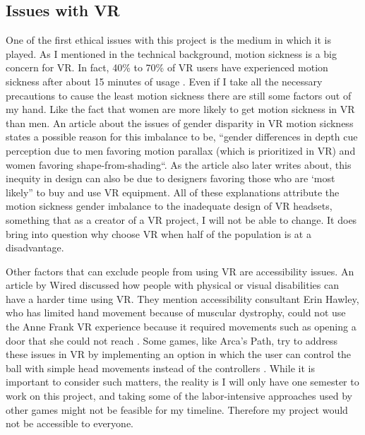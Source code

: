 \documentclass[11pt,twocolumn]{article}
\begin{document}
\subsection{Issues with VR}
One of the first ethical issues with this project is the medium in which it is played. As I mentioned in the technical background, motion sickness is a big concern for VR. In fact, 40\% to 70\% of VR users have experienced motion sickness after about 15 minutes of usage \cite{motionsicknessvr2019}. Even if I take all the necessary precautions to cause the least motion sickness there are still some factors out of my hand. Like the fact that women are more likely to get motion sickness in VR than men. An article about the issues of gender disparity in VR motion sickness states a possible reason for this imbalance to be, “gender differences in depth cue perception due to men favoring motion parallax (which is prioritized in VR) and women favoring shape-from-shading“\cite{vrbarriers2018}. As the article also later writes about, this inequity in design can also be due to designers favoring those who are ‘most likely” to buy and use VR equipment\cite{vrbarriers2018}. All of these explanations attribute the motion sickness gender imbalance to the inadequate design of VR headsets, something that as a creator of a VR project, I will not be able to change. It does bring into question why choose VR when half of the population is at a disadvantage. 

Other factors that can exclude people from using VR are accessibility issues. An article by Wired discussed how people with physical or visual disabilities can have a harder time using VR. They mention accessibility consultant Erin Hawley, who has limited hand movement because of muscular dystrophy, could not use the Anne Frank VR experience because it required movements such as opening a door that she could not reach \cite{vraccessibility2022}. Some games, like Arca’s Path, try to address these issues in VR by implementing an option in which the user can control the ball with simple head movements instead of the controllers \cite{arcaspath2018}. While it is important to consider such matters, the reality is I will only have one semester to work on this project, and taking some of the labor-intensive approaches used by other games might not be feasible for my timeline. Therefore my project would not be accessible to everyone.
\end{document}
